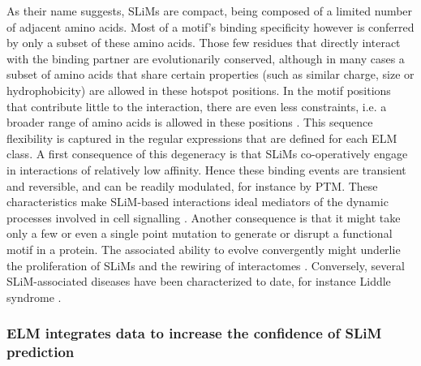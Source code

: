 \documentclass[12pt]{article}
\begin{document}
As their name suggests, SLiMs are compact, being composed of a limited number of
adjacent amino acids. Most of a motif's binding specificity however is conferred
by only a subset of these amino acids. Those few residues that directly interact
with the binding partner are evolutionarily conserved, although in many cases a
subset of amino acids that share certain properties (such as similar charge,
size or hydrophobicity) are allowed in these hotspot positions. In the motif
positions that contribute little to the interaction, there are even less
constraints, i.e. a broader range of amino acids is allowed in these positions
\citep{21909575}. This sequence flexibility is captured in the regular
expressions that are defined for each ELM class. A first consequence of this
degeneracy is that SLiMs co-operatively engage in interactions of relatively low
affinity. Hence these binding events are transient and reversible, and can be
readily modulated, for instance by PTM. These characteristics make SLiM-based
interactions ideal mediators of the dynamic processes involved in cell
signalling \citep{22480932}. Another consequence is that it might take only a few
or even a single point mutation to generate or disrupt a functional motif in a
protein. The associated ability to evolve convergently might underlie the
proliferation of SLiMs and the rewiring of interactomes \citep{26589632,
22346764}. Conversely, several SLiM-associated diseases have been
characterized to date, for instance Liddle syndrome \citep{15483078}.

\subsubsection*{ELM integrates data to increase the confidence of SLiM prediction}
\end{document}
